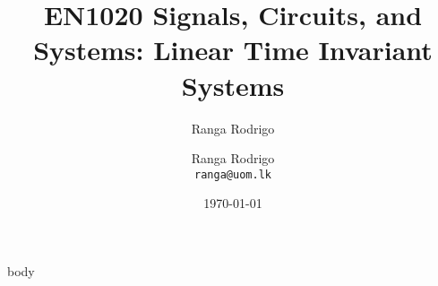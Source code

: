 \documentclass[t, aspectratio=169,xcolor={svgnames}, 10pt]{beamer}
\title{EN1020 Signals, Circuits, and Systems: Linear Time Invariant Systems}
\author{Ranga Rodrigo}
\author[]{Ranga Rodrigo\\ \texttt{ranga@uom.lk}}
\institute[]{The University of Moratuwa, Sri Lanka}
\date{\today}
\begin{document}
    \begin{frame}
        \titlepage
    \end{frame} 








    {body}












\end{document}

